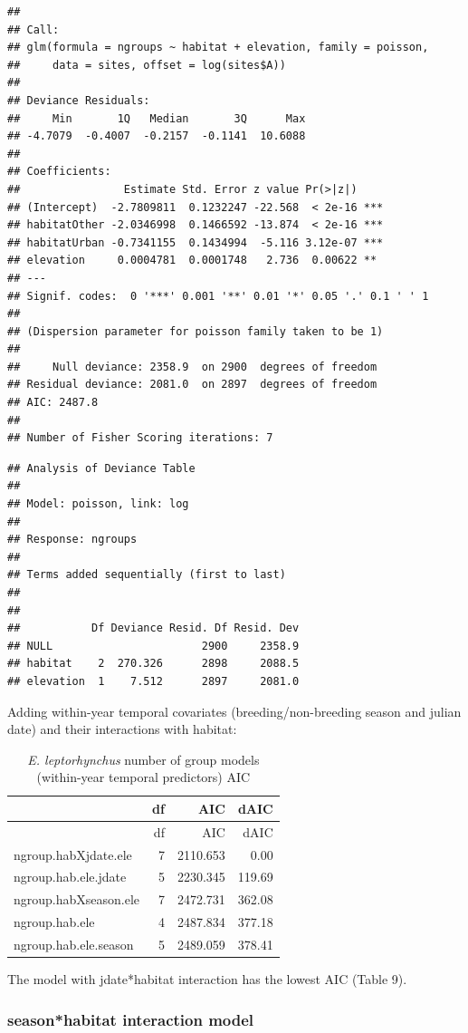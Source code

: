 \documentclass[]{article}
\begin{document}
\begin{verbatim}
## 
## Call:
## glm(formula = ngroups ~ habitat + elevation, family = poisson, 
##     data = sites, offset = log(sites$A))
## 
## Deviance Residuals: 
##     Min       1Q   Median       3Q      Max  
## -4.7079  -0.4007  -0.2157  -0.1141  10.6088  
## 
## Coefficients:
##                Estimate Std. Error z value Pr(>|z|)    
## (Intercept)  -2.7809811  0.1232247 -22.568  < 2e-16 ***
## habitatOther -2.0346998  0.1466592 -13.874  < 2e-16 ***
## habitatUrban -0.7341155  0.1434994  -5.116 3.12e-07 ***
## elevation     0.0004781  0.0001748   2.736  0.00622 ** 
## ---
## Signif. codes:  0 '***' 0.001 '**' 0.01 '*' 0.05 '.' 0.1 ' ' 1
## 
## (Dispersion parameter for poisson family taken to be 1)
## 
##     Null deviance: 2358.9  on 2900  degrees of freedom
## Residual deviance: 2081.0  on 2897  degrees of freedom
## AIC: 2487.8
## 
## Number of Fisher Scoring iterations: 7
\end{verbatim}

\begin{verbatim}
## Analysis of Deviance Table
## 
## Model: poisson, link: log
## 
## Response: ngroups
## 
## Terms added sequentially (first to last)
## 
## 
##           Df Deviance Resid. Df Resid. Dev
## NULL                       2900     2358.9
## habitat    2  270.326      2898     2088.5
## elevation  1    7.512      2897     2081.0
\end{verbatim}

Adding within-year temporal covariates (breeding/non-breeding season and
julian date) and their interactions with habitat:

\begin{longtable}[]{@{}lrrr@{}}
\caption{\textit{E. leptorhynchus} number of group models (within-year
temporal predictors) AIC}\tabularnewline
\toprule
& df & AIC & dAIC\tabularnewline
\midrule
\endfirsthead
\toprule
& df & AIC & dAIC\tabularnewline
\midrule
\endhead
ngroup.habXjdate.ele & 7 & 2110.653 & 0.00\tabularnewline
ngroup.hab.ele.jdate & 5 & 2230.345 & 119.69\tabularnewline
ngroup.habXseason.ele & 7 & 2472.731 & 362.08\tabularnewline
ngroup.hab.ele & 4 & 2487.834 & 377.18\tabularnewline
ngroup.hab.ele.season & 5 & 2489.059 & 378.41\tabularnewline
\bottomrule
\end{longtable}

The model with jdate*habitat interaction has the lowest AIC (Table 9).

\subsubsection{season*habitat interaction
model}\label{seasonhabitat-interaction-model-1}
\end{document}

